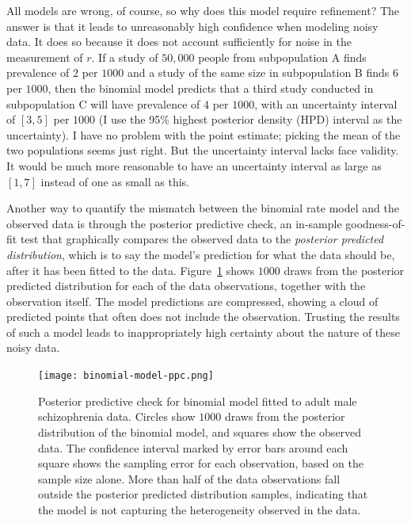 All models are wrong, of course, so why does this model require
refinement? The answer is that it leads to unreasonably high
confidence when modeling noisy data.  It does so because it does not
account sufficiently for noise in the measurement of $r$. If a study
of $50,000$ people from subpopulation A finds prevalence of $2$ per
$1000$ and a study of the same size in subpopulation B finds $6$ per
$1000$, then the binomial model predicts that a third study conducted
in subpopulation C will have prevalence of $4$ per $1000$, with an
uncertainty interval of $[3,5]$ per $1000$ (I use the 95\% highest
posterior density (HPD) interval as the uncertainty).  I have no
problem with the point estimate; picking the mean of the two
populations seems just right.  But the uncertainty interval lacks face
validity.  It would be much more reasonable to have an uncertainty
interval as large as $[1,7]$ instead of one as small as this.

Another way to quantify the mismatch between the binomial rate model
and the observed data is through the posterior predictive check, an
in-sample goodness-of-fit test that graphically compares the observed
data to the \emph{posterior predicted distribution}, which is to say
the model's prediction for what the data should be, after it has been
fitted to the data.\cite{gelman_bayesian_2003}
Figure~\ref{rate-model-binom-ppc} shows $1000$ draws from the
posterior predicted distribution for each of the data observations,
together with the observation itself.  The model predictions are
compressed, showing a cloud of predicted points that often does not
include the observation.  Trusting the results of such a model leads
to inappropriately high certainty about the nature of these noisy data.

\begin{figure}[ht]
\begin{center}
\texttt{[image: binomial-model-ppc.png]}
\caption{Posterior predictive check for binomial model fitted to adult
  male schizophrenia data.  Circles show $1000$ draws from
  the posterior distribution of the binomial model, and squares
  show the observed data.  The confidence interval marked by error
  bars around each square shows the sampling error for each
  observation, based on the sample size alone. More than half of the
  data observations fall outside the posterior predicted distribution
  samples, indicating that the model is not capturing the
  heterogeneity observed in the data.}
\label{rate-model-binom-ppc}
\end{center}
\end{figure}


